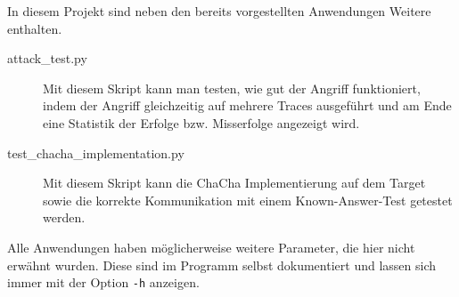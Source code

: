 \documentclass[a4paper,ngerman]{scrreprt}
\begin{document}
In diesem Projekt sind neben den bereits vorgestellten Anwendungen Weitere
enthalten.

\begin{description}
    \item[attack\_test.py] Mit diesem Skript kann man testen, wie gut der
        Angriff funktioniert, indem der Angriff gleichzeitig auf mehrere Traces
        ausgeführt und am Ende eine Statistik der Erfolge bzw. Misserfolge
        angezeigt wird.

    \item[test\_chacha\_implementation.py] Mit diesem Skript kann die ChaCha
        Implementierung auf dem Target sowie die korrekte Kommunikation mit
        einem Known-Answer-Test getestet werden.
\end{description}

Alle Anwendungen haben möglicherweise weitere Parameter, die hier nicht erwähnt
wurden. Diese sind im Programm selbst dokumentiert und lassen sich immer mit der
Option \verb+-h+ anzeigen.




\printbibliography
\end{document}
